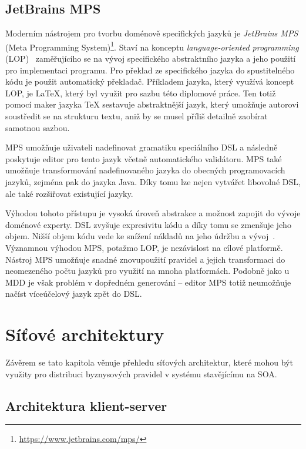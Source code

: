 \subsection{JetBrains MPS}

Moderním nástrojem pro tvorbu doménově specifických jazyků je \textit{JetBrains MPS}
(Meta Programming System)\footnote{\url{https://www.jetbrains.com/mps/}}.
Staví na konceptu \textit{language-oriented programming} (\gls{LOP})~\cite{ward1994language} zaměřujícího
se na vývoj specifického abstraktního jazyka a jeho použití pro implementaci programu. Pro překlad ze specifického
jazyka do spustitelného kódu je použit automatický překladač. Příkladem jazyka, který využívá koncept \gls{LOP},
je \LaTeX\xspace, který byl využit pro sazbu této diplomové práce. Ten totiž pomocí maker jazyka \TeX\xspace
sestavuje abstraktnější jazyk, který umožňuje autorovi soustředit se na strukturu textu, aniž by
se musel příliš detailně zaobírat samotnou sazbou.

MPS umožňuje uživateli nadefinovat gramatiku speciálního \gls{DSL} a následně poskytuje
editor pro tento jazyk včetně automatického validátoru. MPS také umožňuje transformování
nadefinovaného jazyka do obecných programovacích jazyků, zejména pak do jazyka Java.
Díky tomu lze nejen vytvářet libovolné \gls{DSL}, ale také rozšiřovat existující jazyky.

Výhodou tohoto přístupu je vysoká úroveň abstrakce a možnost zapojit do vývoje doménové experty.
\gls{DSL} zvyšuje expresivitu kódu a díky tomu se zmenšuje jeho objem.
Nižší objem kódu vede ke snížení nákladů na jeho údržbu a vývoj~\cite{littman1987mental, soloway1986empirical}.
Významnou výhodou MPS, potažmo \gls{LOP}, je nezávislost na cílové platformě.
Nástroj MPS umožňuje snadné znovupoužití pravidel a jejich transformaci do neomezeného počtu jazyků pro
využití na mnoha platformách. Podobně jako u \gls{MDD} je však problém v dopředném
generování -- editor MPS totiž neumožňuje načíst víceúčelový jazyk zpět do \gls{DSL}.

\section{Síťové architektury}

Závěrem se tato kapitola věnuje přehledu síťových architektur, které mohou být využity pro
distribuci byznysových pravidel v systému stavějícímu na \gls{SOA}.

\subsection{Architektura klient-server}\label{sec:client-server}

